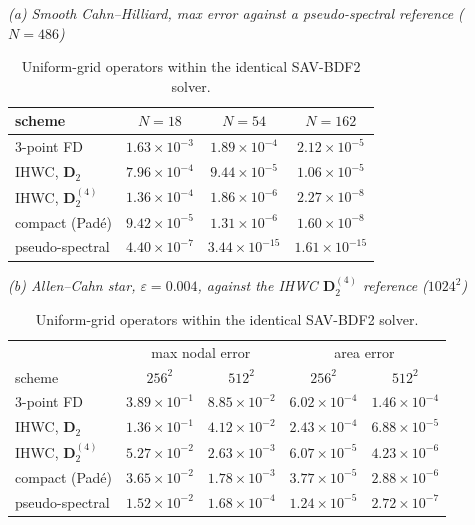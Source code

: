 \documentclass[11pt]{article}
\begin{document}
\begin{table}[htbp]\centering\small
\caption{Uniform-grid operators within the identical SAV-BDF2 solver.}
\textit{(a) Smooth Cahn--Hilliard, max error against a pseudo-spectral reference ($N=486$)}\\[2pt]
\begin{tabular}{l ccc}
\toprule
scheme & $N=18$ & $N=54$ & $N=162$\\
\midrule
3-point FD & $1.63{\times}10^{-3}$ & $1.89{\times}10^{-4}$ & $2.12{\times}10^{-5}$\\
IHWC, $\mathbf D_2$ & $7.96{\times}10^{-4}$ & $9.44{\times}10^{-5}$ & $1.06{\times}10^{-5}$\\
IHWC, $\mathbf D_2^{(4)}$ & $1.36{\times}10^{-4}$ & $1.86{\times}10^{-6}$ & $2.27{\times}10^{-8}$\\
compact (Pad\'e) & $9.42{\times}10^{-5}$ & $1.31{\times}10^{-6}$ & $1.60{\times}10^{-8}$\\
pseudo-spectral & $4.40{\times}10^{-7}$ & $3.44{\times}10^{-15}$ & $1.61{\times}10^{-15}$\\
\bottomrule
\end{tabular}

\medskip
\textit{(b) Allen--Cahn star, $\varepsilon=0.004$, against the IHWC $\mathbf D_2^{(4)}$ reference ($1024^2$)}\\[2pt]
\begin{tabular}{l cc cc}
\toprule
& \multicolumn{2}{c}{max nodal error} & \multicolumn{2}{c}{area error}\\
scheme & $256^2$ & $512^2$ & $256^2$ & $512^2$\\
\midrule
3-point FD & $3.89{\times}10^{-1}$ & $8.85{\times}10^{-2}$ & $6.02{\times}10^{-4}$ & $1.46{\times}10^{-4}$\\
IHWC, $\mathbf D_2$ & $1.36{\times}10^{-1}$ & $4.12{\times}10^{-2}$ & $2.43{\times}10^{-4}$ & $6.88{\times}10^{-5}$\\
IHWC, $\mathbf D_2^{(4)}$ & $5.27{\times}10^{-2}$ & $2.63{\times}10^{-3}$ & $6.07{\times}10^{-5}$ & $4.23{\times}10^{-6}$\\
compact (Pad\'e) & $3.65{\times}10^{-2}$ & $1.78{\times}10^{-3}$ & $3.77{\times}10^{-5}$ & $2.88{\times}10^{-6}$\\
pseudo-spectral & $1.52{\times}10^{-2}$ & $1.68{\times}10^{-4}$ & $1.24{\times}10^{-5}$ & $2.72{\times}10^{-7}$\\
\bottomrule
\end{tabular}
\end{table}
\end{document}
